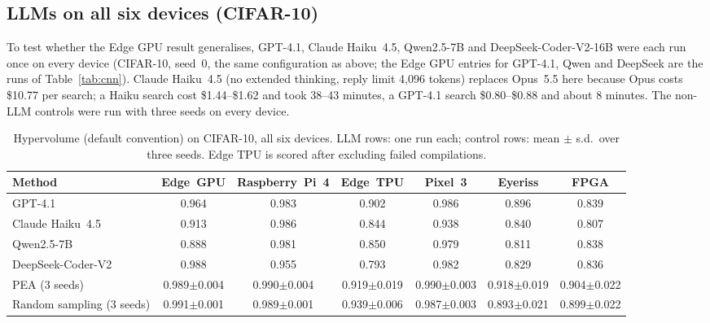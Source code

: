 \documentclass[11pt,a4paper]{article}
\begin{document}
\subsection{LLMs on all six devices (CIFAR-10)}\label{sec:multidevice}
To test whether the Edge GPU result generalises, GPT-4.1, Claude Haiku~4.5, Qwen2.5-7B and DeepSeek-Coder-V2-16B were each run once on every device (CIFAR-10, seed~0, the same configuration as above; the Edge GPU entries for GPT-4.1, Qwen and DeepSeek are the runs of Table~\ref{tab:cnn}). Claude Haiku~4.5 (no extended thinking, reply limit 4{,}096 tokens) replaces Opus~5.5 here because Opus costs \$10.77 per search; a Haiku search cost \$1.44--\$1.62 and took 38--43 minutes, a GPT-4.1 search \$0.80--\$0.88 and about 8 minutes. The non-LLM controls were run with three seeds on every device.

\begin{table}[h]\centering\footnotesize
\caption{Hypervolume (default convention) on CIFAR-10, all six devices. LLM rows: one run each; control rows: mean $\pm$ s.d.\ over three seeds. Edge TPU is scored after excluding failed compilations.}\label{tab:multidevice}
\setlength{\tabcolsep}{3pt}
\begin{tabular}{lcccccc}
\toprule
Method & Edge~GPU & Raspberry~Pi~4 & Edge~TPU & Pixel~3 & Eyeriss & FPGA \\
\midrule
GPT-4.1 & 0.964 & 0.983 & 0.902 & 0.986 & 0.896 & 0.839 \\
Claude Haiku~4.5 & 0.913 & 0.986 & 0.844 & 0.938 & 0.840 & 0.807 \\
Qwen2.5-7B & 0.888 & 0.981 & 0.850 & 0.979 & 0.811 & 0.838 \\
DeepSeek-Coder-V2 & 0.988 & 0.955 & 0.793 & 0.982 & 0.829 & 0.836 \\
PEA (3 seeds) & 0.989$\pm$0.004 & 0.990$\pm$0.004 & 0.919$\pm$0.019 & 0.990$\pm$0.003 & 0.918$\pm$0.019 & 0.904$\pm$0.022 \\
Random sampling (3 seeds) & 0.991$\pm$0.001 & 0.989$\pm$0.001 & 0.939$\pm$0.006 & 0.987$\pm$0.003 & 0.893$\pm$0.021 & 0.899$\pm$0.022 \\
\bottomrule
\end{tabular}
\end{table}
\end{document}
